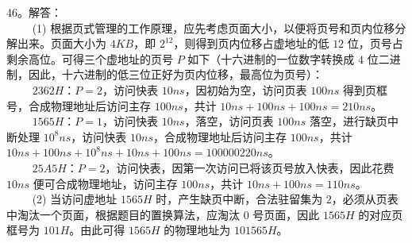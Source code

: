 46。解答： \\
$\qquad$ (1) 根据页式管理的工作原理，应先考虑页面大小，以便将页号和页内位移分解出来。页面大小为 $4KB$，即 $2^{12}$，则得到页内位移占虚地址的低 $12$ 位，页号占剩余高位。可得三个虚地址的页号 $P$ 如下（十六进制的一位数字转换成 $4$ 位二进制，因此，十六进制的低三位正好为页内位移，最高位为页号）： \\
$\qquad$ $2362H$：$P=2$，访问快表 $10ns$，因初始为空，访问页表 $100ns$ 得到页框号，合成物理地址后访问主存 $100ns$，共计 $10ns+100ns+100ns=210ns$。 \\
$\qquad$ $1565H$：$P=1$，访问快表 $10ns$，落空，访问页表 $100ns$ 落空，进行缺页中断处理 $10^8ns$，访问快表 $10ns$，合成物理地址后访问主存 $100ns$，共计 $10ns+100ns+10^8ns+10ns+100ns=100 000 220ns$。 \\
$\qquad$ $25A5H$：$P=2$，访问快表，因第一次访问已将该页号放入快表，因此花费 $10ns$ 便可合成物理地址，访问主存 $100ns$，共计 $10ns+100ns=110ns$。 \\
$\qquad$ (2) 当访问虚地址 $1565H$ 时，产生缺页中断，合法驻留集为 $2$，必须从页表中淘汰一个页面，根据题目的置换算法，应淘汰 $0$ 号页面，因此 $1565H$ 的对应页框号为 $101H$。由此可得 $1565H$ 的物理地址为 $101565H$。

